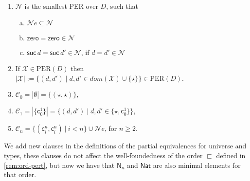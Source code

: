 \documentclass{LMCS}
\renewcommand{\geq}{\geqslant}
\theoremstyle{plain}\newtheorem{satz}[thm]{Satz}
\newcommand{\bla}{\ensuremath{\mbox{$$}}}
\newcommand{\natty}{\mathsf{Nat}}
\newcommand{\ztm}{\mathsf{zero}}
\newcommand{\X}{\mathcal{X}}
\newcommand{\smashed}[1]{|#1|}
\newcommand{\dom}{\mathit{dom}}
\newcommand{\perD}{\mbox{PER}(D)}
\newcommand{\perne}{\mathord{\mathcal{N}\!\mathit{e}}}
\newcommand{\dprf}{\star}
\newcommand{\constD}[2]{\mathsf{c}^{#1}_{#2}}
\newcommand{\enumD}[1]{\mathsf{N}_{#1}}
\newcommand{\C}[1]{\ensuremath{\mathcal{C}_{#1}}}
\newcommand{\iZero}{\ztm}
\newcommand{\iNat}{\natty}
\newcommand{\perNat}{\mathcal{N}}
\newcommand{\iSuc}[1]{\mathsf{suc}\,#1}
\begin{document}
{\begin{defi} \label{def:pernat}\bla
  \begin{enumerate}[(1)]
  \item $\perNat$ is the smallest PER over $D$, such that
    \begin{enumerate}[(a)]
    \item $\perne \subseteq \perNat$
    \item $\iZero = \iZero \in \perNat$
    \item $\iSuc{d} = \iSuc{d'} \in \perNat $, if $d=d' \in \perNat$
    \end{enumerate}
  \item If $\X \in \perD$ then $\smashed \X := \{ (d,d') \mid d,d' \in
     \dom(\X)\cup\{\star\} \} \in \perD$.
\item $\C 0 = |\emptyset| = \{(\dprf,\dprf)\}$,
   \item $\C 1 = |\{\constD{1}{0}\}| = \{(d,d') \mid d,d' \in
     \{\dprf,\constD 1 0\}\}$,
  \item 
    $\mathcal{C}_n = \{(\constD{n}{i},\constD{n}{i})\ |\ i < n \} \cup
    \perne$, for $n \geq 2$.
  \end{enumerate}
\end{defi}

We add new clauses in the definitions of the partial equivalences for
universe and types, these clauses do not affect the well-foundedness
of the order $\sqsubset$ defined in \ref{rem:ord-pert}, but now we
have that $\enumD{n}$ and $\iNat$ are also minimal elements for that
order.

}
\end{document}
